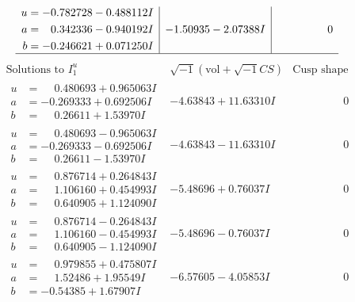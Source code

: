\documentclass[1p]{elsarticle_modified}
\theoremstyle{definition}
\newcommand{\I}{\sqrt{-1}}
\begin{document}
$$\begin{array}{c|c|c}
\begin{aligned}
u &= -0.782728 - 0.488112 I \\
a &= \phantom{-}0.342336 - 0.940192 I \\
b &= -0.246621 + 0.071250 I\end{aligned}
 & -1.50935 - 2.07388 I & \phantom{-0.000000 } 0\\
 \hline 
 \end{array}$$\newpage$$\begin{array}{c|c|c}  
\text{Solutions to }I^u_{1}& \I (\text{vol} + \sqrt{-1}CS) & \text{Cusp shape}\\
 \hline 
\begin{aligned}
u &= \phantom{-}0.480693 + 0.965063 I \\
a &= -0.269333 + 0.692506 I \\
b &= \phantom{-}0.26611 + 1.53970 I\end{aligned}
 & -4.63843 + 11.63310 I & \phantom{-0.000000 } 0 \\ \hline\begin{aligned}
u &= \phantom{-}0.480693 - 0.965063 I \\
a &= -0.269333 - 0.692506 I \\
b &= \phantom{-}0.26611 - 1.53970 I\end{aligned}
 & -4.63843 - 11.63310 I & \phantom{-0.000000 } 0 \\ \hline\begin{aligned}
u &= \phantom{-}0.876714 + 0.264843 I \\
a &= \phantom{-}1.106160 + 0.454993 I \\
b &= \phantom{-}0.640905 + 1.124090 I\end{aligned}
 & -5.48696 + 0.76037 I & \phantom{-0.000000 } 0 \\ \hline\begin{aligned}
u &= \phantom{-}0.876714 - 0.264843 I \\
a &= \phantom{-}1.106160 - 0.454993 I \\
b &= \phantom{-}0.640905 - 1.124090 I\end{aligned}
 & -5.48696 - 0.76037 I & \phantom{-0.000000 } 0 \\ \hline\begin{aligned}
u &= \phantom{-}0.979855 + 0.475807 I \\
a &= \phantom{-}1.52486 + 1.95549 I \\
b &= -0.54385 + 1.67907 I\end{aligned}
 & -6.57605 - 4.05853 I & \phantom{-0.000000 } 0 \\ \hline\begin{aligned}

\end{aligned}
\end{array}$$
\end{document}
